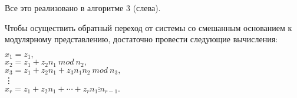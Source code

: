 Все это реализовано в алгоритме 3 (слева). \par
Чтобы осуществить обратный переход от системы со смешанным
основанием к модулярному представлению, достаточно провести 
следующие вычисления:
\begin{flushleft}
\hspace{2cm}$x_{1} = z_{1},$ \\ 
\hspace{2cm}$x_{2} = z_{1} + z_{2}n_{1}\ mod\ n_{2},$ \\ 
\hspace{2cm}$x_{3} = z_{1} + z_{2}n_{1} + z_{3}n_{1}n_{2}\ mod\ n_{3},$ \\ 
\hspace{2.5cm} \vdots  \\
\hspace{2cm}$x_{r} = z_{1} + z_{2}n_{1} + \cdots + z_{r}n_{1} \vdots n_{r-1}.$
\end{flushleft}
\pagebreak
\newpage

